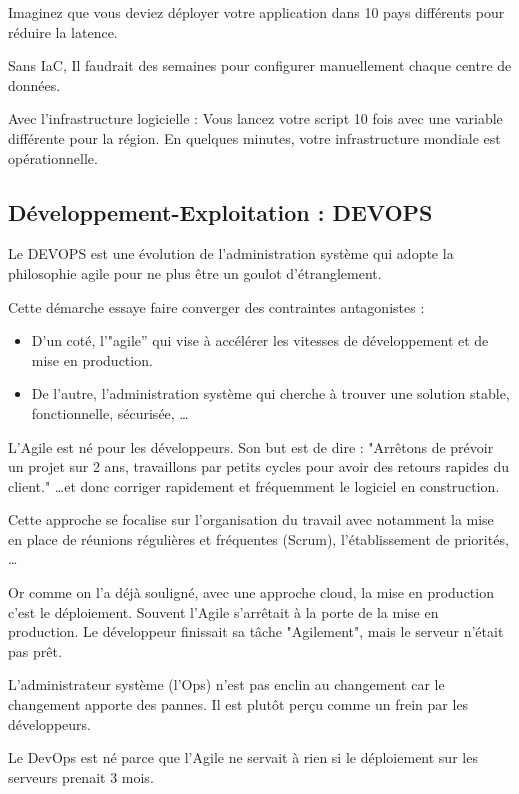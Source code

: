 \documentclass{rapportClass} %
\begin{document}
  Imaginez que vous deviez déployer votre application dans 10 pays
  différents pour réduire la latence.

  Sans IaC, Il faudrait des semaines pour configurer manuellement
  chaque centre de données.

  Avec l'infrastructure logicielle : Vous lancez votre script 10 fois
  avec une variable différente pour la région. En quelques minutes,
  votre infrastructure mondiale est opérationnelle.

\subsection{Développement-Exploitation :  DEVOPS}

Le DEVOPS est une évolution de l'administration système qui adopte la
philosophie agile pour ne plus être un goulot d'étranglement.

Cette démarche essaye faire converger des contraintes antagonistes :
\begin{itemize}
\item D'un coté, l'"agile'' qui vise à accélérer les vitesses de
  développement et de mise en production.
\item De l'autre, l'administration système qui cherche à trouver une
  solution stable, fonctionnelle, sécurisée, \ldots
\end{itemize}

L'Agile est né pour les développeurs. Son but est de dire : "Arrêtons
de prévoir un projet sur 2 ans, travaillons par petits cycles pour
avoir des retours rapides du client." \ldots et donc corriger
rapidement et fréquemment le logiciel en construction.

Cette approche se focalise sur l'organisation du travail avec
notamment la mise en place de réunions régulières et fréquentes
(Scrum), l'établissement de priorités, \ldots

Or comme on l'a déjà souligné, avec une approche cloud, la mise en
production c'est le déploiement. Souvent l'Agile s'arrêtait
à la porte de la mise en production. Le développeur finissait sa tâche
"Agilement", mais le serveur n'était pas prêt.

L'administrateur système (l'Ops) n'est pas enclin au changement car le
changement apporte des pannes. Il est plutôt perçu comme un frein par les
développeurs.

Le DevOps est né parce que l'Agile ne servait à rien si le déploiement
sur les serveurs prenait 3 mois.
\end{document}
